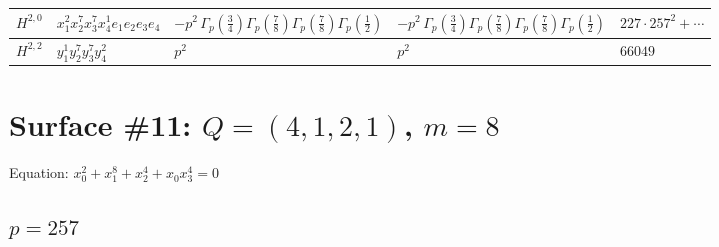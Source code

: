 \documentclass[11pt]{article}
\begin{document}
\begin{table}[ht]
{\begin{tabular}{@{}lllll@{}}
\midrule
$H^{2,0}$ & $x_{1}^{2} x_{2}^{7} x_{3}^{7} x_{4}^{1}  e_{1} e_{2} e_{3} e_{4}$ & $- p^{2} \, \Gamma_p \left( \frac{3}{4} \right) \Gamma_p \left( \frac{7}{8} \right) \Gamma_p \left( \frac{7}{8} \right) \Gamma_p \left( \frac{1}{2} \right)$ & $- p^{2} \, \Gamma_p \left( \frac{3}{4} \right) \Gamma_p \left( \frac{7}{8} \right) \Gamma_p \left( \frac{7}{8} \right) \Gamma_p \left( \frac{1}{2} \right)$ & $227{\cdot}257^{2}{+}\cdots$ \\
\midrule
$H^{2,2}$ & $y_{1}^{1} y_{2}^{7} y_{3}^{7} y_{4}^{2}$ & $p^{2} \,$ & $p^{2} \,$ & $66049$ \\
\bottomrule
\end{tabular}
}
\renewcommand{\arraystretch}{1.0}
\end{table}

\newpage

\section*{Surface \#11: $Q=(4, 1, 2, 1)$, $m=8$}

Equation: $x_0^{2} + x_1^{8} + x_2^{4} + x_0 x_3^{4} = 0$

\subsection*{$p = 257$}
\end{document}
